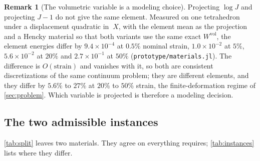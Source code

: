 \documentclass{article}
\newcommand{\bX}{~X}
\newcommand{\supvol}{^{\mathrm{vol}}}
\newcommand{\code}[1]{\texttt{#1}}
\theoremstyle{definition}
\newtheorem{remark}{Remark}
\theoremstyle{plain}
\begin{document}
\begin{remark}[The volumetric variable is a modeling choice]
\label{rem:thetachoice}
Projecting $\log J$ and projecting $J - 1$ do not give the same element.
Measured on one tetrahedron under a displacement quadratic in $\bX$, with the
element mean as the projection and a Hencky material so that both variants use
the same exact $W\supvol$, the element energies differ by
$9.4\times10^{-4}$ at $0.5\%$ nominal strain,
$1.0\times10^{-2}$ at $5\%$,
$5.6\times10^{-2}$ at $20\%$ and
$2.7\times10^{-1}$ at $50\%$
(\code{prototype/materials.jl}). The difference is $O(\text{strain})$ and
vanishes with it, so both are consistent discretizations of the same continuum
problem; they are different elements, and they differ by $5.6\%$ to $27\%$ at
$20\%$ to $50\%$ strain, the finite-deformation regime of
\cref{sec:problem}. Which variable is projected is therefore a modeling
decision.
\end{remark}

\subsection{The two admissible instances}
\label{sec:instances}

\cref{tab:split} leaves two materials. They agree on everything
 requires;
\cref{tab:instances} lists where they differ.
\end{document}
